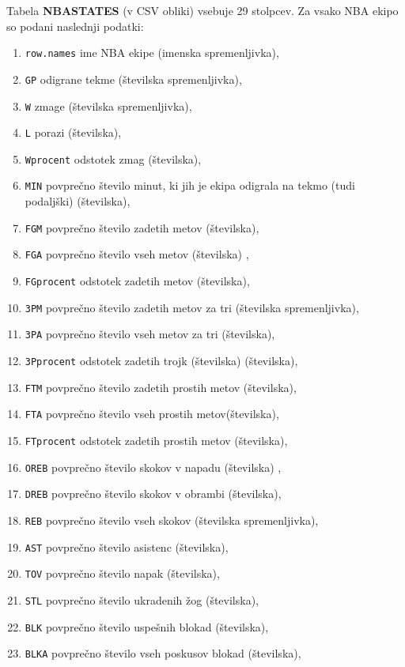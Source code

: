 \documentclass[11pt,a4paper]{article}
\begin{document}
Tabela \textbf{NBASTATES} (v CSV obliki) vsebuje 29 stolpcev. Za vsako NBA ekipo so podani naslednji podatki:

\begin{enumerate}
\item{\verb|row.names| ime NBA ekipe (imenska spremenljivka),}
\item{\verb|GP| odigrane tekme (številska spremenljivka),}
\item{\verb|W| zmage (številska spremenljivka),}
\item{ \verb|L| porazi (številska),}
\item{\verb|Wprocent| odstotek zmag (številska),}
\item{\verb|MIN| povprečno število minut, ki jih je ekipa odigrala na tekmo (tudi podaljški) (številska),}
\item{\verb|FGM| povprečno število zadetih metov (številska),}
\item{\verb|FGA| povprečno število vseh metov (številska) ,}
\item{\verb|FGprocent| odstotek zadetih metov (številska),}
\item{\verb|3PM| povprečno število zadetih metov za tri (številska spremenljivka),}
\item{\verb|3PA| povprečno število vseh metov za tri (številska),}
\item{ \verb|3Pprocent| odstotek zadetih trojk (številska) (številska),}
\item{\verb|FTM| povprečno število zadetih prostih metov (številska),}
\item{\verb|FTA| povprečno število vseh prostih metov(številska),}
\item{\verb|FTprocent| odstotek zadetih prostih metov (številska),}
\item{\verb|OREB| povprečno število skokov v napadu (številska) ,}
\item{\verb|DREB| povprečno število skokov v obrambi (številska),}
\item{\verb|REB| povprečno število vseh skokov (številska spremenljivka),}
\item{\verb|AST| povprečno število asistenc (številska),}
\item{ \verb|TOV| povprečno število napak (številska),}
\item{\verb|STL| povprečno število ukradenih žog (številska),}
\item{\verb|BLK| povprečno število uspešnih blokad (številska),}
\item{\verb|BLKA| povprečno število vseh poskusov blokad (številska),}

\end{enumerate}
\end{document}
